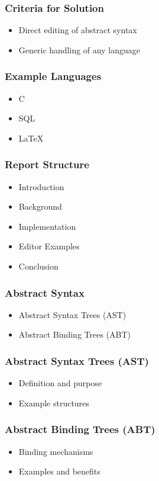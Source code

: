 \documentclass[t,24pt,aspectratio=169]{beamer}
\begin{document}
\begin{frame}[hvid]
    \frametitle{Criteria for Solution}
    \begin{itemize}
        \item Direct editing of abstract syntax
        \item Generic handling of any language
    \end{itemize}
\end{frame}

\begin{frame}[hvid]
    \frametitle{Example Languages}
    \begin{itemize}
        \item C
        \item SQL
        \item LaTeX
    \end{itemize}
\end{frame}

\begin{frame}[hvid]
    \frametitle{Report Structure}
    \begin{itemize}
        \item Introduction
        \item Background
        \item Implementation
        \item Editor Examples
        \item Conclusion
    \end{itemize}
\end{frame}

\begin{frame}[hvid]
    \frametitle{Abstract Syntax}
    \begin{itemize}
        \item Abstract Syntax Trees (AST)
        \item Abstract Binding Trees (ABT)
    \end{itemize}
\end{frame}

\begin{frame}[hvid]
    \frametitle{Abstract Syntax Trees (AST)}
    \begin{itemize}
        \item Definition and purpose
        \item Example structures
    \end{itemize}
\end{frame}

\begin{frame}[hvid]
    \frametitle{Abstract Binding Trees (ABT)}
    \begin{itemize}
        \item Binding mechanisms
        \item Examples and benefits
    \end{itemize}
\end{frame}
\end{document}
